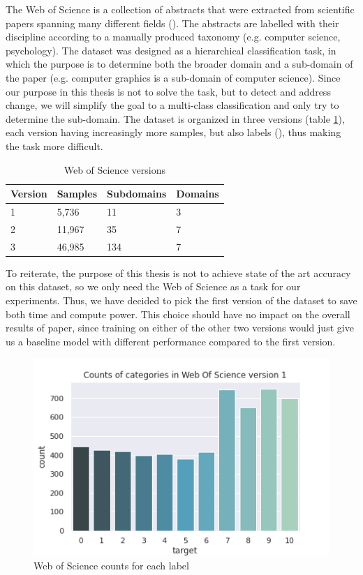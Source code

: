\documentclass[12pt]{extreport}
\begin{document}
The Web of Science is a collection of abstracts that were extracted from scientific papers spanning many different fields (\cite{wos}). The abstracts are labelled with their discipline according to a manually produced taxonomy (e.g. computer science, psychology). The dataset was designed as a hierarchical classification task, in which the purpose is to determine both the broader domain and a sub-domain of the paper (e.g. computer graphics is a sub-domain of computer science). Since our purpose in this thesis is not to solve the task, but to detect and address change, we will simplify the goal to a multi-class classification and only try to determine the sub-domain. The dataset is organized in three versions (table \ref{table:wos}), each version having increasingly more samples, but also labels (\cite{wos}), thus making the task more difficult.

\begin{table}[ht!]
\centering
\begin{tabular}{|l|l|l|l|}
\hline
Version & Samples & Subdomains & Domains \\ \hline
1       & 5,736   & 11         & 3       \\ \hline
2       & 11,967  & 35         & 7       \\ \hline
3       & 46,985  & 134        & 7       \\ \hline
\end{tabular}
\caption{Web of Science versions}
\label{table:wos}
\end{table}

To reiterate, the purpose of this thesis is not to achieve state of the art accuracy on this dataset, so we only need the Web of Science as a task for our experiments. Thus, we have decided to pick the first version of the dataset to save both time and compute power. This choice should have no impact on the overall results of paper, since training on either of the other two versions would just give us a baseline model with different performance compared to the first version.

\begin{figure}[ht!]
\centering
\includegraphics[width=0.8\linewidth]{assets/framework/wos_counts_1.png}
\caption{Web of Science counts for each label}
\label{fig:wos-1}
\end{figure}
\end{document}
